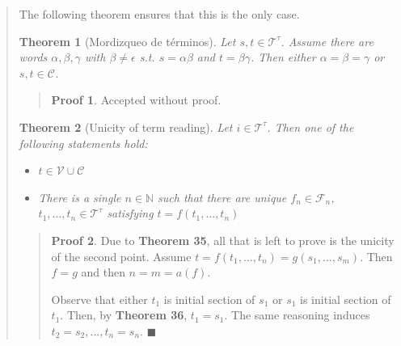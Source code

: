 \documentclass[a4paper, 12pt]{article}
\newtheorem{theorem}{Theorem}
\theoremstyle{definition}
\theoremstyle{definition}
\theoremstyle{definition}
\newtheorem{pro}{Proof}
\begin{document}
\begin{quote}
The following theorem ensures that this is the only case.

\begin{theorem}[Mordizqueo de términos]
    Let $s, t \in \mathcal{T}^\tau$. Assume there are words 
    $\alpha, \beta, \gamma$ with $\beta \neq \epsilon$ s.t. 
    $s = \alpha\beta$ and $t = \beta \gamma$.
    Then either $\alpha = \beta = \gamma$ or 
    $s, t \in \mathcal{C}$.
\end{theorem}


\small
\begin{quote}

\begin{pro}
    Accepted without proof.
\end{pro}

\end{quote}
\normalsize

\begin{theorem}[Unicity of term reading]
    Let $i \in \mathcal{T}^{\tau}$. Then one of the following statements 
    hold: 

    \begin{itemize}
        \item $t \in \mathcal{V} \cup \mathcal{C}$
        \item There is a single $n \in \mathbb{N}$ such that 
            there are unique $f_n \in \mathcal{F}_n$,
            $t_1, \ldots, t_n \in \mathcal{T}^{\tau}$ satisfying
            $t = f(t_1, \ldots, t_n)$
    \end{itemize}
\end{theorem}


\small
\begin{quote}

\begin{pro}
    Due to \textbf{Theorem 35}, all that is left to prove is the unicity of the
    second point. Assume $t = f(t_1, \ldots, t_n) = g(s_1, \ldots, s_m)$. Then
    $f = g$ and then $n = m = a(f)$. 

    Observe that either $t_1$ is initial section of $s_1$ or 
    $s_1$ is initial section of $t_1$. Then, by \textbf{Theorem 36},
    $t_1 = s_1$. The same reasoning induces $t_2 = s_2, \ldots, t_n = s_n$. 
    $\blacksquare$
\end{pro}

\end{quote}
\normalsize



\end{quote}
\end{document}
